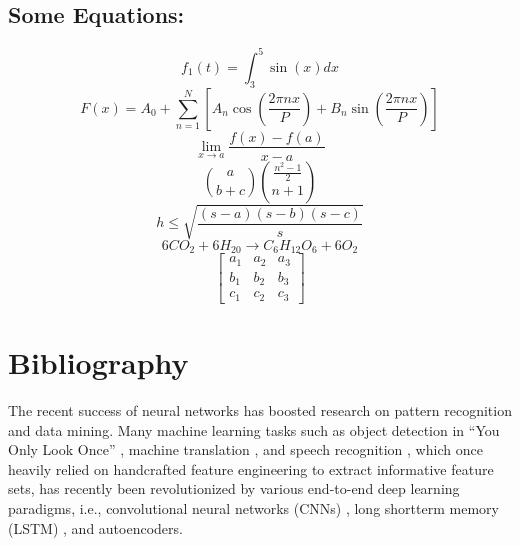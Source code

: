 \documentclass[14pt]{article}
\begin{document}
\subsection*{Some Equations:}
$$f_1(t)=\int_{3}^5 \sin (x)dx$$
$$F(x)=A_0+ \sum_{n=1}^N\left[A_n\cos\left(\frac{2\pi nx}{P}\right)+B_n\sin\left(\frac{2\pi nx}{P}\right)\right]$$
$$\lim_{x \to a} \frac{f(x)-f(a)}{x-a}$$
$$\binom{a}{b+c} \binom{\frac{n^2-1}{2}}{n+1}$$
$$h \leq \sqrt{\frac{(s-a)(s-b)(s-c)}{s}}$$
$$6CO_2+6H_20\xrightarrow{} C_6H_{12}O_6+6O_2$$
$$\begin{bmatrix}
    a_{1}  & a_{2} & a_{3}  \\
    b_{1}  & b_{2} & b_{3} \\
    c_{1} & c_{2} & c_{3}
\end{bmatrix}$$
\section{Bibliography}
The recent success of neural networks has boosted research on pattern recognition and data mining. Many machine learning tasks such as object detection in “You Only Look Once” \cite{blah1}, machine translation \cite{blah2}, and speech recognition \cite{blah3}, which once heavily relied on handcrafted feature engineering to extract informative feature sets, has recently been revolutionized by various end-to-end deep learning paradigms, i.e., convolutional neural networks (CNNs) \cite{blah5}, long shortterm memory (LSTM) \cite{blah4}, and autoencoders.
\pagebreak
\printbibliography
\end{document}
